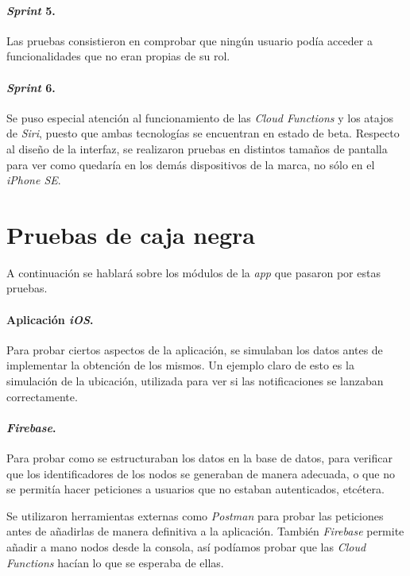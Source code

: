 \paragraph{\textit{Sprint} 5.}Las pruebas consistieron en comprobar que ningún usuario podía acceder a funcionalidades que no eran propias de su rol.

\paragraph{\textit{Sprint} 6.}Se puso especial atención al funcionamiento de las \textit{Cloud Functions} y los atajos de \textit{Siri}, puesto que ambas tecnologías se encuentran en estado de beta. Respecto al diseño de la interfaz, se realizaron pruebas en distintos tamaños de pantalla para ver como quedaría en los demás dispositivos de la marca, no sólo en el \textit{iPhone SE}.

\section{Pruebas de caja negra}
A continuación se hablará sobre los módulos de la \textit{app} que pasaron por estas pruebas.

\paragraph{Aplicación \textit{iOS}.}Para probar ciertos aspectos de la aplicación, se simulaban los datos antes de implementar la obtención de los mismos. Un ejemplo claro de esto es la simulación de la ubicación, utilizada para ver si las notificaciones se lanzaban correctamente.

\paragraph{\textit{Firebase}.}Para probar como se estructuraban los datos en la base de datos, para verificar que los identificadores de los nodos se generaban de manera adecuada, o que no se permitía hacer peticiones a usuarios que no estaban autenticados, etcétera.

Se utilizaron herramientas externas como \textit{Postman} para probar las peticiones antes de añadirlas de manera definitiva a la aplicación. También \textit{Firebase} permite añadir a mano nodos desde la consola, así podíamos probar que las \textit{Cloud Functions} hacían lo que se esperaba de ellas.

